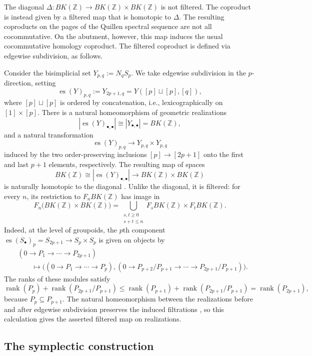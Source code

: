 \documentclass[12 pt]{amsart}
\newcommand{\ZZ}{\mathbb{Z}}
\newcommand{\rank}{\operatorname{rank}}
\newcommand{\es}{\operatorname{es}}
\newcommand{\<}{\langle}
\renewcommand{\>}{\rangle}
\theoremstyle{definition}
\begin{document}
\medskip

The diagonal $\Delta \colon BK(\ZZ) \to BK(\ZZ) \times BK(\ZZ)$ is not filtered. The coproduct is instead given by a filtered map that is homotopic to $\Delta$. The resulting coproducts on the pages of the Quillen spectral sequence are not all cocommutative. On the abutment, however, this map induces the usual cocommutative homology coproduct. The filtered coproduct is defined via edgewise subdivision, as follows.

Consider the bisimplicial set $Y_{p, q} := N_q S_p$. We take edgewise subdivision in the $p$-direction, setting
\[
\es(Y)_{p, q} := Y_{2p + 1, q} = Y([p] \sqcup [p], [q]),
\]
where $[p] \sqcup [p]$ is ordered by concatenation, i.e., lexicographically on $[1] \times [p]$. There is a natural homeomorphism of geometric realizations
\[
| \es(Y)_{\bullet, \bullet} | \cong |Y_{\bullet, \bullet} | = BK(\ZZ),
\]
and a natural transformation
\[
\es(Y)_{p, q} \to Y_{p, q} \times Y_{p, q}
\]
induced by the two order-preserving inclusions $[p] \to [2p + 1]$ onto the first and last $p + 1$ elements, respectively. The resulting map of spaces
\[
BK(\ZZ) \cong | \es(Y)_{\bullet, \bullet} | \to BK(\ZZ) \times BK(\ZZ)
\]
is naturally homotopic to the diagonal \cite[\S3]{BCGP}. Unlike the diagonal, it is filtered: for every $n$, its restriction to $F_n BK(\ZZ)$ has image in
\[
F_n\bigl(BK(\ZZ) \times BK(\ZZ)\bigr) = \bigcup_{\substack {s, t \geq 0\\s + t \leq n}} F_s BK(\ZZ) \times F_t BK(\ZZ).
\]
Indeed, at the level of groupoids, the $p$th component $\es(S_\bullet)_p = S_{2p + 1} \to S_p \times S_p$ is given on objects by
\[
\begin{aligned}
& (0 \to P_1 \to \cdots \to P_{2p + 1})\\
& \qquad \longmapsto \bigl((0 \to P_1 \to \cdots \to P_p), (0 \to P_{p + 2}/P_{p + 1} \to \cdots \to P_{2p + 1}/P_{p + 1})\bigr).
\end{aligned}
\]
The ranks of these modules satisfy
\[
\rank(P_p) + \rank(P_{2p + 1}/P_{p + 1}) \leq \rank(P_{p + 1}) + \rank(P_{2p + 1}/P_{p + 1}) = \rank(P_{2p + 1}),
\]
because $P_p \subseteq P_{p + 1}$. The natural homeomorphism between the realizations before and after edgewise subdivision preserves the induced filtrations \cite[Lemma~3.3]{BCGP}, so this calculation gives the asserted filtered map on realizations.


\subsection{The symplectic construction}\label{sec:symplectic-S}
\end{document}

